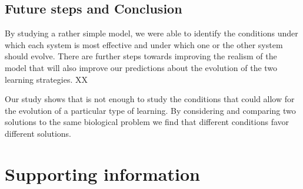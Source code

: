  
\subsection*{Future steps and Conclusion}
 
By studying a rather simple model, we were able to identify the conditions under which each system is most effective and under which one or the other system should evolve. There are further steps towards improving the realism of the model that will also improve our predictions about the evolution of the two learning strategies. XX

Our study shows that is not enough to study the conditions that could allow for the evolution of a particular type of learning. By considering and comparing two solutions to the same biological problem we find that different conditions favor different solutions. %


\newpage



\clearpage{}
\renewcommand{\thesection}{}
\section{Supporting information}
\renewcommand{\thesection}{S}
\renewcommand{\thesubsection}{S\arabic{subsection}}
\renewcommand{\theequation}{S\arabic{equation}}
\renewcommand{\thetable}{S\arabic{table}}
\renewcommand{\thefigure}{S\arabic{figure}}
\setcounter{equation}{0}  
\setcounter{figure}{0}
\setcounter{table}{0}

